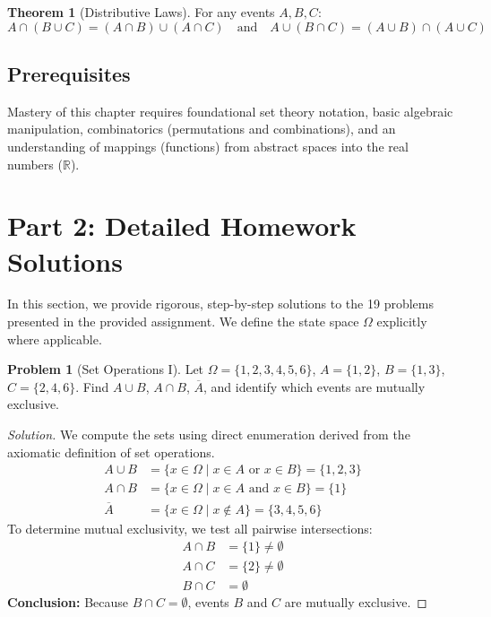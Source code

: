 \documentclass[11pt, letterpaper]{article}
\theoremstyle{definition}
\newtheorem{theorem}{Theorem}[section]
\newtheorem{example}{Problem}
\theoremstyle{remark}
\newcommand{\R}{\mathbb{R}}
\newcommand{\comp}[1]{\overline{#1}}
\begin{document}
\begin{theorem}[Distributive Laws]
    For any events $A, B, C$:
    \[ A \cap (B \cup C) = (A \cap B) \cup (A \cap C) \quad \text{and} \quad A \cup (B \cap C) = (A \cup B) \cap (A \cup C) \]
\end{theorem}

\subsection{Prerequisites}
Mastery of this chapter requires foundational set theory notation, basic algebraic manipulation, combinatorics (permutations and combinations), and an understanding of mappings (functions) from abstract spaces into the real numbers ($\R$).

\newpage
\section{Part 2: Detailed Homework Solutions}

In this section, we provide rigorous, step-by-step solutions to the 19 problems presented in the provided assignment. We define the state space $\Omega$ explicitly where applicable.

\begin{example}[Set Operations I]
    Let $\Omega = \{1, 2, 3, 4, 5, 6\}$, $A = \{1, 2\}$, $B = \{1, 3\}$, $C = \{2, 4, 6\}$. Find $A \cup B$, $A \cap B$, $\comp{A}$, and identify which events are mutually exclusive.
\end{example}
\begin{proof}[Solution]
    We compute the sets using direct enumeration derived from the axiomatic definition of set operations.
    \begin{align*}
        A \cup B &= \{x \in \Omega \mid x \in A \text{ or } x \in B\} = \{1, 2, 3\} \\
        A \cap B &= \{x \in \Omega \mid x \in A \text{ and } x \in B\} = \{1\} \\
        \comp{A} &= \{x \in \Omega \mid x \notin A\} = \{3, 4, 5, 6\}
    \end{align*}
    To determine mutual exclusivity, we test all pairwise intersections:
    \begin{align*}
        A \cap B &= \{1\} \neq \emptyset \\
        A \cap C &= \{2\} \neq \emptyset \\
        B \cap C &= \emptyset
    \end{align*}
    \textbf{Conclusion:} Because $B \cap C = \emptyset$, events $B$ and $C$ are mutually exclusive.
\end{proof}
\end{document}
